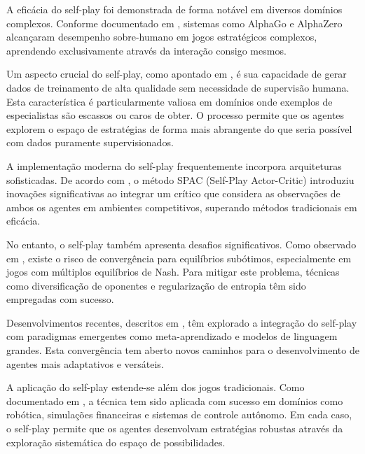 A eficácia do self-play foi demonstrada de forma notável em diversos domínios complexos. Conforme documentado em \cite{https://pt.eitca.org/artificial-intelligence/eitc-ai-arl-advanced-reinforcement-learning/case-studies/classic-games-case-study/examination-review-classic-games-case-study/how-does-reinforcement-learning-through-self-play-contribute-to-the-development-of-superhuman-ai-performance-in-classic-games/}, sistemas como AlphaGo e AlphaZero alcançaram desempenho sobre-humano em jogos estratégicos complexos, aprendendo exclusivamente através da interação consigo mesmos.

Um aspecto crucial do self-play, como apontado em \cite{https://arxiv.org/html/2408.01072v1}, é sua capacidade de gerar dados de treinamento de alta qualidade sem necessidade de supervisão humana. Esta característica é particularmente valiosa em domínios onde exemplos de especialistas são escassos ou caros de obter. O processo permite que os agentes explorem o espaço de estratégias de forma mais abrangente do que seria possível com dados puramente supervisionados.

A implementação moderna do self-play frequentemente incorpora arquiteturas sofisticadas. De acordo com \cite{https://april.zju.edu.cn/core/papercite-data/pdf/liu2021spr.pdf}, o método SPAC (Self-Play Actor-Critic) introduziu inovações significativas ao integrar um crítico que considera as observações de ambos os agentes em ambientes competitivos, superando métodos tradicionais em eficácia.

No entanto, o self-play também apresenta desafios significativos. Como observado em \cite{https://proceedings.mlr.press/v119/bai20a.html}, existe o risco de convergência para equilíbrios subótimos, especialmente em jogos com múltiplos equilíbrios de Nash. Para mitigar este problema, técnicas como diversificação de oponentes e regularização de entropia têm sido empregadas com sucesso.

Desenvolvimentos recentes, descritos em \cite{https://openreview.net/forum?id=6smHoMdqhY}, têm explorado a integração do self-play com paradigmas emergentes como meta-aprendizado e modelos de linguagem grandes. Esta convergência tem aberto novos caminhos para o desenvolvimento de agentes mais adaptativos e versáteis.

A aplicação do self-play estende-se além dos jogos tradicionais. Como documentado em \cite{https://recodechinaai.substack.com/p/strawberry-o1-and-self-play-reinforcement}, a técnica tem sido aplicada com sucesso em domínios como robótica, simulações financeiras e sistemas de controle autônomo. Em cada caso, o self-play permite que os agentes desenvolvam estratégias robustas através da exploração sistemática do espaço de possibilidades.

